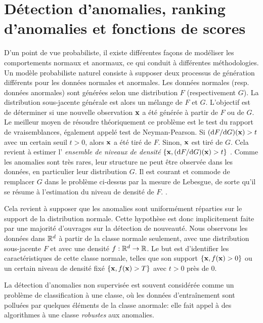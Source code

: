 \section{Détection d'anomalies, ranking d'anomalies et fonctions de scores}
\label{resume_fr:scoring_function}
D'un point de vue probabiliste, il existe différentes façons de modéliser les comportements normaux et anormaux, ce qui conduit à différentes méthodologies. Un modèle probabiliste naturel consiste à supposer deux processus de génération différents pour les données normales et anormales. Les données normales (resp. données anormales) sont générées selon une distribution $F$ (respectivement $G$). La distribution sous-jacente générale est alors un mélange de $F$ et $G$. L'objectif est de déterminer si une nouvelle observation $ \mathbf x $ a été générée à partir de $ F $ ou de $ G $. Le meilleur moyen de résoudre théoriquement ce problème est le test du rapport de vraisemblances, également appelé test de Neyman-Pearson. Si $ (\mathrm{d} F / \mathrm{d} G) (\mathbf x)> t $ avec un certain seuil $ t> 0 $, alors $ \mathbf x $ a été tiré de $ F $. Sinon, $ \mathbf x $ est tiré de $ G $. Cela revient à estimer l' \emph{ensemble de niveaux de densité} $ \{\mathbf x, (\mathrm{d} F / \mathrm{d} G) (\mathbf x)> t \} $ \citep{Scholkopf2001, Steinwart2005, Scott2006, VertVert}.
%
Comme les anomalies sont très rares, leur structure ne peut être observée dans les données, en particulier leur distribution $ G $.
%
Il est courant et commode de remplacer $ G $ dans le problème ci-dessus par la mesure de Lebesgue, de sorte qu'il se résume à l'estimation du niveau de densité de $ F $.
\citep{Scholkopf2001, Scott2006, VertVert}.

Cela revient à supposer que les anomalies sont uniformément réparties sur le support de la distribution normale. %
Cette hypothèse est donc implicitement faite par une majorité d'ouvrages sur la détection de nouveauté.
%
Nous observons les données dans $ \mathbb{R} ^ d $ à partir de la classe normale seulement, avec une distribution sous-jacente $ F $ et avec une densité $ f: \mathbb{R} ^ d \to \mathbb{R} $.
Le but est d'identifier les caractéristiques de cette classe normale, telles que son support $ \{\mathbf x, f (\mathbf x)> 0 \} $ ou un certain niveau de densité fixé $ \{\mathbf x, f (\mathbf x )> T \} $ avec $ t> 0 $ près de $ 0 $.

La détection d'anomalies non supervisée est souvent considérée comme un problème de classification à une classe, où les données d'entraînement sont polluées par quelques éléments de la classe anormale: elle fait appel à des algorithmes à une classe \emph{robustes} aux anomalies.

